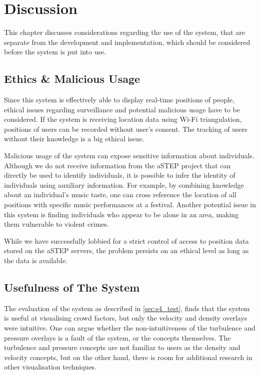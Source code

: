 \chapter{Discussion}\label{ch:discussion}

This chapter discusses considerations regarding the use of the system, that are separate from the development and implementation, which should be considered before the system is put into use.

\section{Ethics \& Malicious Usage}
Since this system is effectively able to display real-time positions of people, ethical issues regarding surveillance and potential malicious usage have to be considered. If the system is receiving location data using Wi-Fi triangulation, positions of users can be recorded without user's consent. The tracking of users without their knowledge is a big ethical issue.

Malicious usage of the system can expose sensitive information about individuals. Although we do not receive information from the aSTEP project that can directly be used to identify individuals, it is possible to infer the identity of individuals using auxiliary information. For example, by combining knowledge about an individual's music taste, one can cross reference the location of all positions with specific music performances at a festival. Another potential issue in this system is finding individuals who appear to be alone in an area, making them vulnerable to violent crimes.

While we have successfully lobbied for a strict control of access to position data stored on the aSTEP servers, the problem persists on an ethical level as long as the data is available.

\section{Usefulness of The System}
The evaluation of the system as described in \cref{sec:s4_test}, finds that the system is useful at visualising crowd factors, but only the velocity and density overlays were intuitive. One can argue whether the non-intuitiveness of the turbulence and pressure overlays is a fault of the system, or the concepts themselves. The turbulence and pressure concepts are not familiar to users as the density and velocity concepts, but on the other hand, there is room for additional research in other visualisation techniques. 


